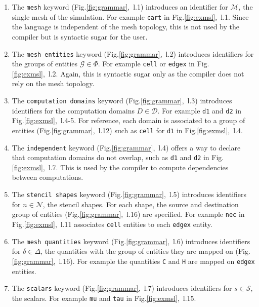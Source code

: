 \begin{enumerate}

\item The \texttt{mesh} keyword (Fig.\ref{fig:grammar},~l.1) introduces an identifier for $\mathcal{M}$, the single mesh of the simulation. For example \texttt{cart} in Fig.\ref{fig:exmsl},~l.1. Since the language is independent of the mesh topology, this is not used by the compiler but is syntactic sugar for the user.%

\item The \texttt{mesh entities} keyword (Fig.\ref{fig:grammar},~l.2) introduces identifiers for the groups of entities $\mathcal{G}\in\Phi$. For example \texttt{cell} or \texttt{edgex} in Fig.\ref{fig:exmsl},~l.2. Again, this is syntactic sugar only as the compiler does not rely on the mesh topology.

\item The \texttt{computation domains} keyword (Fig.\ref{fig:grammar},~l.3) introduces identifiers for the computation domains $D\in\mathcal{D}$. For example \texttt{d1} and \texttt{d2} in Fig.\ref{fig:exmsl},~l.4-5. For reference, each domain is associated to a group of entities (Fig.\ref{fig:grammar},~l.12) such as \texttt{cell} for \texttt{d1} in Fig.\ref{fig:exmsl},~l.4.

\item The \texttt{independent} keyword (Fig.\ref{fig:grammar},~l.4) offers a way to declare that computation domains do not overlap, such as \texttt{d1} and \texttt{d2} in  Fig.\ref{fig:exmsl},~l.7. This is used by the compiler to compute dependencies between computations.

\item The \texttt{stencil shapes} keyword (Fig.\ref{fig:grammar},~l.5) introduces identifiers for $n\in\mathcal{N}$, the stencil shapes. For each shape, the source and destination group of entities (Fig.\ref{fig:grammar},~l.16) are specified. For example \texttt{nec} in Fig.\ref{fig:exmsl},~l.11 associates \texttt{cell} entities to each \texttt{edgex} entity.

\item The \texttt{mesh quantities} keyword (Fig.\ref{fig:grammar},~l.6) introduces identifiers for $\delta\in\Delta$, the quantities with the group of entities they are mapped on (Fig.\ref{fig:grammar},~l.16). For example the quantities \texttt{C} and \texttt{H} are mapped on \texttt{edgex} entities.

\item The \texttt{scalars} keyword (Fig.\ref{fig:grammar},~l.7) introduces identifiers for $s\in\mathcal{S}$, the scalars. For example \texttt{mu} and \texttt{tau} in Fig.\ref{fig:exmsl},~l.15. 


\end{enumerate}

